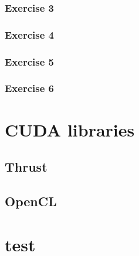 \documentclass[12px,oz]{report}
\theoremstyle{indented}
\begin{document}
		\subsection{Exercise 3}
		
		
		\subsection{Exercise 4}
		
		
		\subsection{Exercise 5}
		
		\subsection{Exercise 6}
	
\chapter{CUDA libraries}
\label{ch-libraries}


	\section{Thrust}
	\label{sec-thrust}
	
	
	\section{OpenCL}
	\label{sec-opencl}
	

\cite{McCool2012}
\cite{udacity:parallel}




\appendix
\chapter{test}
\end{document}
